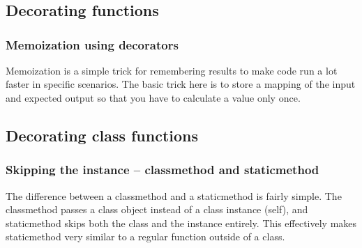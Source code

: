\chapter{\label{}}
\section{Decorating functions}
\subsection{Memoization using decorators}
Memoization is a simple trick for remembering results to make code run a lot faster in specific scenarios. The basic trick here is to store a mapping of the input and expected output so that you have to calculate a value only once.
\section{Decorating class functions}
\subsection{Skipping the instance – classmethod and staticmethod}
The difference between a classmethod and a staticmethod is fairly simple. The classmethod passes a class object instead of a class instance (self), and staticmethod skips both the class and the instance entirely. This effectively makes staticmethod very similar to a regular function outside of a class.